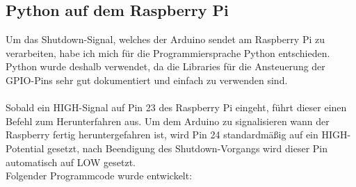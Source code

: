 \subsection{Python auf dem Raspberry Pi}

Um das Shutdown-Signal, welches der Arduino sendet am Raspberry Pi zu verarbeiten, habe ich mich für die Programmiersprache Python entschieden. Python wurde deshalb verwendet, da die Libraries für die Ansteuerung der GPIO-Pins sehr gut dokumentiert und einfach zu verwenden sind.\\
\\
Sobald ein HIGH-Signal auf Pin 23 des Raspberry Pi eingeht, führt dieser einen Befehl zum Herunterfahren aus. Um dem Arduino zu signalisieren wann der Raspberry fertig heruntergefahren ist, wird Pin 24 standardmäßig auf ein HIGH-Potential gesetzt, nach Beendigung des Shutdown-Vorgangs wird dieser Pin automatisch auf LOW gesetzt.
\\
Folgender Programmcode wurde entwickelt:

